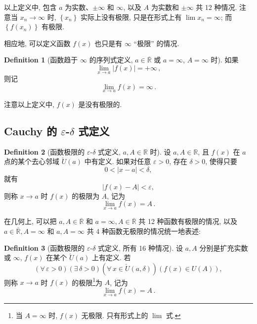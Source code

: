 \documentclass{book}
\newcommand{\Exists}{\exists\,}
\newcommand{\Any}{\forall\,}
\newcommand{\set}[1]{\left\{#1\right\}}
\newcommand{\exR}{\overline{\mathbb{R}}}
\newcommand{\abs}[1]{\left\lvert #1 \right\rvert}
\newcommand{\R}{\mathbb{R}}
\newcommand{\puncU}[1]{\check{U}\!\left( #1 \right)}
\renewcommand{\U}[1]{U\!\left( #1 \right)}%
\numberwithin{equation}{section}
\numberwithin{figure}{section}
\theoremstyle{definition}
\newtheorem{definition}{Definition}
\begin{document}
以上定义中, 包含 $a$ 为实数、$\pm\infty$ 和 $\infty$, 以及 $A$ 为实数和 $\pm\infty$ 共 12 种情况. 注意当 $x_n\to\infty$ 时, $\set{x_n}$ 实际上没有极限, 只是在形式上有 $\lim x_n=\infty$; 而 $\set{f(x_n)}$ 有极限.

相应地, 可以定义函数 $f(x)$ 也只是有 $\infty$ ``极限'' 的情况.
\begin{definition}[函数趋于 $\infty$ 的序列式定义, $a\in\exR$ 或 $a=\infty$, $A=\infty$ 时]
  如果
  \begin{equation*}
    \lim_{x\to a}\abs{f(x)}=+\infty\,,
  \end{equation*}
  则记
  \begin{equation*}
    \lim_{x\to a}f(x)=\infty\,.
  \end{equation*}
\end{definition}

注意以上定义中, $f(x)$ 是没有极限的.

\subsection[Cauchy 的 epsilon-delta 式定义]{Cauchy 的 $\varepsilon$-$\delta$ 式定义}
\begin{definition}[函数极限的 $\varepsilon$-$\delta$ 式定义, $a,A\in\R$ 时]
  设 $a,A\in\R$, 且 $f(x)$ 在 $a$ 点的某个去心邻域 $\puncU{a}$ 中有定义. 如果对任意 $\varepsilon>0$, 存在 $\delta>0$, 使得只要
  \begin{equation*}
    0<\abs{x-a}<\delta,
  \end{equation*}
  就有
  \begin{equation*}
    \abs{f(x)-A}<\varepsilon,
  \end{equation*}
  则称 $x\to a$ 时 $f(x)$ 的极限为 $A$, 记为
  \begin{equation*}
    \lim_{x\to a}f(x)=A\,.
  \end{equation*}
\end{definition}

在几何上, 可以把 $a,A\in\exR$ 和 $a=\infty,A\in\exR$ 共 12 种函数有极限的情况, 以及 $a\in\exR,A=\infty$ 和 $a,A=\infty$ 共 4 种函数无极限的情况统一地表述:
\begin{definition}[函数极限的 $\varepsilon$-$\delta$ 式定义, 所有 16 种情况]
  设 $a,A$ 分别是扩充实数或 $\infty$, $f(x)$ 在某个 $\puncU{a}$ 上有定义. 若
  \begin{equation*}
    (\Any\varepsilon>0)(\Exists\delta>0)(\Any x\in\puncU{a,\delta})(f(x)\in\U{A}),
  \end{equation*}
  则称 $x\to a$ 时 $f(x)$ 的极限\footnote{当 $A=\infty$ 时, $f(x)$ 无极限. 只有形式上的 $\lim$ 式.}为 $A$, 记为
  \begin{equation*}
    \lim_{x\to a}f(x)=A\,.
  \end{equation*}
\end{definition}
\end{document}
